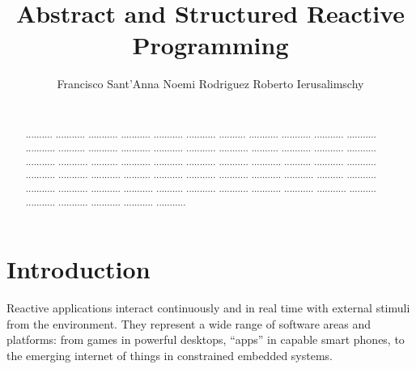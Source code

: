 \documentclass{acm_proc_article-sp}
\newcommand{\1}{\;}
\newcommand{\2}{\;\;}
\newcommand{\3}{\;\;\;}
\newcommand{\5}{\;\;\;\;\;}
\begin{document}
\title {
    Abstract and Structured Reactive Programming
}

\author{
    \alignauthor
    Francisco Sant'Anna \hspace{1cm} Noemi Rodriguez \hspace{1cm} Roberto Ierusalimschy   \\
     \\
}

\maketitle

\begin{abstract}
.......... ........... ........... ........... ........... ...........
.......... ........... ........... ........... ........... ...........
.......... ........... ........... ........... ........... ...........
.......... ........... ........... ........... ........... ...........
.......... ........... ........... ........... ........... ...........
.......... ........... ........... ........... ........... ...........
.......... ........... ........... ........... ........... ...........
.......... ........... ........... ........... ........... ...........
.......... ........... ........... ........... ........... ...........
.......... ........... ........... ........... ........... ...........
\end{abstract}




\section{Introduction}
\label{sec.intro}

Reactive applications interact continuously and in real time with external 
stimuli from the environment.
They represent a wide range of software areas and platforms: from games in 
powerful desktops, ``apps'' in capable smart phones, to the emerging internet 
of things in constrained embedded systems.
\end{document}

